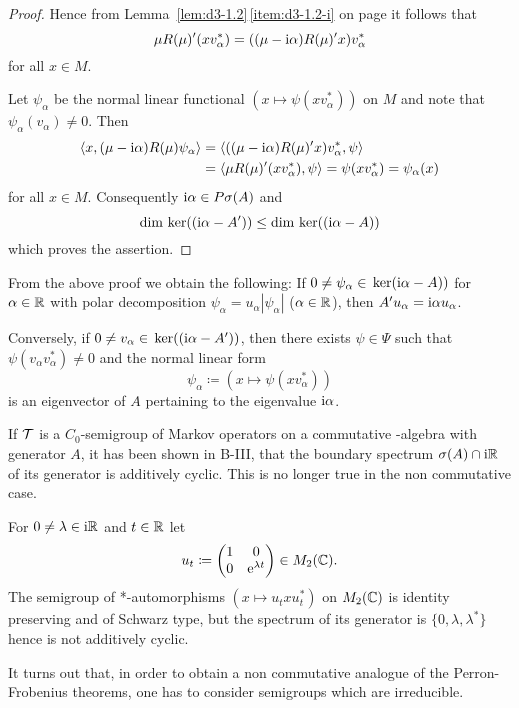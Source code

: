 \begin{proof}
Hence from Lemma~\ref{lem:d3-1.2}\,\ref{item:d3-1.2-i} on page \pageref{lem:d3-1.2} it follows that
\[
\mu R(\mu)'(xv_{\alpha}^{*}) = ((\mu - \mathrm{i}\alpha)R(\mu)'x)v_{\alpha}^{*}
\]
for all $x \in M$.

Let $\psi_{\alpha}$ be the normal linear functional $(x \mapsto \psi(xv_{\alpha}^{*}))$ on $M$ and note that $\psi_{\alpha}(v_{\alpha}) \neq 0$.
Then
\begin{align*}
\langle x, (\mu - \mathrm{i}\alpha)R(\mu)\psi_{\alpha} \rangle &= \langle ((\mu - \mathrm{i}\alpha)R(\mu)'x)v_{\alpha}^{*},\psi \rangle \\
&= \langle \mu R(\mu)'(xv_{\alpha}^{*}),\psi \rangle = \psi(xv_{\alpha}^{*}) = \psi_{\alpha}(x)
\end{align*}
for all $x \in M$.
Consequently $\mathrm{i}\alpha \in P\sigma(A)$ and
\[
\dim \mathop{}\mathrm{ker}((\mathrm{i}\alpha - A')) \leq \dim \mathop{}\mathrm{ker}((\mathrm{i}\alpha - A))
\]
which proves the assertion.
\end{proof}
\begin{remark}\label{rem:d3-1.9}
From the above proof we obtain the following: If 
$0 \neq \psi_{\alpha} \in \mathop{}\mathrm{ker}(\mathrm{i}\alpha - A))$ for $ \alpha \in \mathbb{R} $ with polar decomposition 
$\psi_{\alpha} = u_{\alpha}|\psi_{\alpha}|$ ($\alpha \in \mathbb{R}$), 
then $A'u_{\alpha} = \mathrm{i}\alpha u_{\alpha}$.

Conversely, if $0 \neq v_{\alpha} \in \mathop{}\mathrm{ker}((\mathrm{i}\alpha - A'))$, then there exists $\psi \in \Psi$ such that 
$\psi(v_{\alpha}v_{\alpha}^{*}) \neq 0$ and the normal linear form
\[
\psi_{\alpha} \coloneqq (x \mapsto \psi(xv_{\alpha}^{*}))
\]
is an eigenvector of $A$ pertaining to the eigenvalue $\mathrm{i}\alpha$.
\end{remark}
If $\mathcal{T}$ is a $C_{0}$-semigroup of Markov operators on a commutative \CA-algebra with generator $A$, it has been shown in B-III, that the boundary spectrum $\sigma(A) \cap \mathrm{i}\mathbb{R}$ of its generator is additively cyclic.
This is no longer true in the non commutative case.

\begin{example*}\label{ex:d3-1.10}
For $0 \neq \lambda \in \mathrm{i}\mathbb{R}$ and $t \in \mathbb{R}$ let
\[
u_{t} \coloneqq \begin{pmatrix} 1 & 0 \\ 0 & \mathrm{e}^{\lambda t} \end{pmatrix} \in M_{2}(\mathbb{C}) .
\]
The semigroup of *-automorphisms $(x \mapsto u_{t}xu_{t}^{*})$ on $M_{2}(\mathbb{C})$ is identity preserving and of Schwarz type, but the spectrum of its generator is $\{0, \lambda, \lambda^{*}\}$ hence is not additively cyclic.
\end{example*}
It turns out that, in order to obtain a non commutative analogue of the Perron-Frobenius theorems, one has to consider semigroups which are irreducible.

